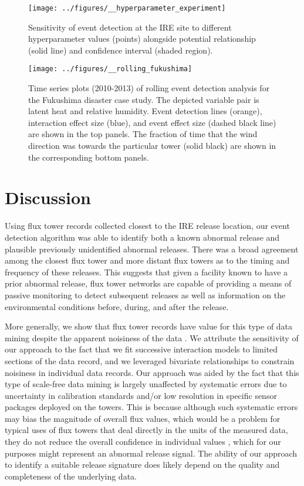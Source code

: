 \documentclass{article}
\begin{document}
\begin{figure}
	\centering
	\texttt{[image: ../figures/\_\_hyperparameter\_experiment]}
	\caption{Sensitivity of event detection at the IRE site to different hyperparameter values (points) alongside potential relationship (solid line) and confidence interval (shaded region).}
	\label{fig:hyperparameter}
\end{figure}

\begin{figure}
	\centering
	\texttt{[image: ../figures/\_\_rolling\_fukushima]}
	\caption{Time series plots (2010-2013) of rolling event detection analysis for the Fukushima disaster case study. The depicted variable pair is latent heat and relative humidity. Event detection lines (orange), interaction effect size (blue), and event effect size (dashed black line) are shown in the top panels. The fraction of time that the wind direction was towards the particular tower (solid black) are shown in the corresponding bottom panels.}
	\label{fig:fukushima}
\end{figure}

\section{Discussion}
Using flux tower records collected closest to the IRE release location, our event detection algorithm was able to identify both a known abnormal release and plausible previously unidentified abnormal releases. There was a broad agreement among the closest flux tower and more distant flux towers as to the timing and frequency of these releases. This suggests that given a facility known to have a prior abnormal release, flux tower networks are capable of providing a means of passive monitoring to detect subsequent releases as well as information on the environmental conditions before, during, and after the release. 

More generally, we show that flux tower records have value for this type of data mining despite the apparent noisiness of the data \citep{fratiniEddyCovarianceFlux2018}. We attribute the sensitivity of our approach to the fact that we fit successive interaction models to limited sections of the data record, and we leveraged bivariate relationships to constrain noisiness in individual data records. Our approach was aided by the fact that this type of scale-free data mining is largely unaffected by systematic errors due to uncertainty in calibration standards and/or low resolution in specific sensor packages deployed on the towers. This is because although such systematic errors may bias the magnitude of overall flux values, which would be a problem for typical uses of flux towers that deal directly in the units of the measured data, they do not reduce the overall confidence in individual values \citep{langfordEddycovarianceDataLow2015}, which for our purposes might represent an abnormal release signal. The ability of our approach to identify a suitable release signature does likely depend on the quality and completeness of the underlying data.
\end{document}
